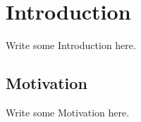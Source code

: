 \section{Introduction}     %
Write some Introduction here.
\subsection{Motivation}
Write some Motivation here.


